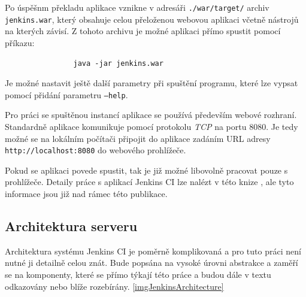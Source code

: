             \medskip
            Po úspěšnm překladu aplikace vznikne v adresáři \texttt{./war/target/} archiv \texttt{jenkins.war}, 
            který obsahuje celou přeloženou webovou aplikaci včetně nástrojů na 
            kterých závisí. Z tohoto archivu je možné aplikaci přímo spustit pomocí příkazu:

            \begin{verbatim}
                java -jar jenkins.war
            \end{verbatim}
            Je možné nastavit ještě další parametry při spuštění programu, které lze vypsat pomocí přidání parametru \texttt{--help}.

            Pro práci se spuštěnou instancí aplikace se používá především webové rozhraní. Standardně aplikace
            komunikuje pomocí protokolu \emph{TCP} na portu 8080. Je tedy možné se na lokálním počítači připojit do aplikace zadáním URL adresy 
            \texttt{http://localhost:8080} do webového prohlížeče. 

            Pokud se aplikaci povede spustit, tak je již možné libovolně pracovat pouze s prohlížeče. Detaily práce s aplikací Jenkins CI
            lze nalézt v této knize \cite{jenkinsBook}, ale tyto informace jsou již nad rámec této publikace.
            
        \subsection{Architektura serveru}
            Architektura systému Jenkins CI je poměrně komplikovaná a pro tuto práci není nutné ji detailně celou znát.
            Bude popsána na vysoké úrovni abstrakce a zaměří se na komponenty, které se přímo týkají této práce
            a budou dále v textu odkazovány nebo blíže rozebírány. \ref{imgJenkinsArchitecture}
       
